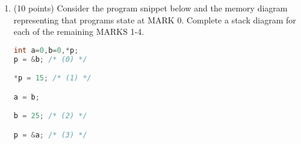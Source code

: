 \documentclass{article}[9pt]
\newenvironment{answerfont}{\fontfamily{qhv}\selectfont}{\par}
\newenvironment{myanswer}{\begin{mdframed}\begin{answerfont}}{\end{answerfont}\end{mdframed}}
\begin{document}
\begin{enumerate}
\begin{enumerate}
\item 

\begin{lstlisting}[language=c]
unsigned int i = 4294967295;
printf("%d\n",i);
\end{lstlisting}


\begin{myanswer}
Output: -1\\
Explanation: unsigned ints go from 0 to 65535.  Since this is out of
range it yields -1.
\end{myanswer}

\item 

\begin{lstlisting}[language=c]
int i = 3.1519;
printf("%d\n", i);
\end{lstlisting}


\begin{myanswer}
Output: 3\\
Explanation: forcing int will simply chop the decimal piece.
\end{myanswer}


\item 
\begin{lstlisting}[language=c]
int i = (int) 1.5 + 2.5 + 3.5 + 4.5
printf("%d\n",i);
\end{lstlisting}

\begin{myanswer}
Output: 11\\
Explanation: the \texttt{(int) 1.5 + ...} evaluates to \texttt{1 + ...} ; adding
the remaining floats, the result is 11.5; forcing it to be an int chops
the .5, leaving 11.
\end{myanswer}

\end{enumerate}

\item (10 points) Consider the program snippet below and the memory diagram representing
that programs state at MARK 0. Complete a stack diagram for each
of the remaining MARKS 1-4. 

\begin{lstlisting}[language=c]
int a=0,b=0,*p;
p = &b; /* (0) */

*p = 15; /* (1) */

a = b;

b = 25; /* (2) */

p = &a; /* (3) */


\end{lstlisting}
\end{enumerate}
\end{document}
